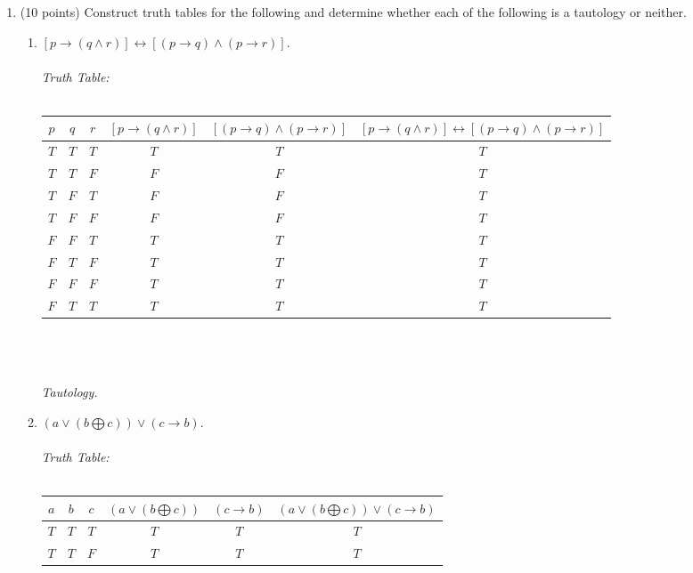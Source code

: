 \documentclass[12pt,fleqn]{article}
\begin{document}
\begin{enumerate}
\begin{enumerate}
\end{enumerate}

\item (10 points) Construct truth tables for the following and determine whether each of the following is a tautology or neither.
\begin{enumerate}
\item \space $[p \rightarrow (q \wedge r)]\leftrightarrow[(p \rightarrow q) \wedge (p \rightarrow r)]$.\\\\


\textit{Truth Table:}\\\\
\begin{tabular}{ c | c | c | c | c | c}
  $p$ & $q$ & $r$ & $[p \rightarrow (q \wedge r)]$ & $[(p \rightarrow q) \wedge (p \rightarrow r)]$ & $[p \rightarrow (q \wedge r)]\leftrightarrow[(p \rightarrow q) \wedge (p \rightarrow r)]$\\ \hline
  $T$ & $T$ & $T$ & $T$ & $T$ &$T$ \\ \hline
  $T$ & $T$ & $F$ & $F$ & $F$ &$T$\\ \hline
  $T$ & $F$ & $T$ & $F$ & $F$ &$T$\\ \hline
  $T$ & $F$ & $F$ & $F$ & $F$ &$T$\\ \hline
  $F$ & $F$ & $T$ & $T$ & $T$ &$T$\\ \hline
  $F$ & $T$ & $F$ & $T$ & $T$ &$T$\\ \hline
  $F$ & $F$ & $F$ & $T$ & $T$ &$T$\\ \hline
  $F$ & $T$ & $T$ & $T$ & $T$ &$T$ \\     
\end{tabular}\\\\\ \\
\textit{Tautology.}\\
\item \space $(a \vee (b \bigoplus c)) \vee (c \rightarrow b)$.\\\\
\textit{Truth Table:}\\\\
\begin{tabular}{ c | c | c | c | c | c}
  $a$ & $b$ & $c$ & $(a \vee (b \bigoplus c))$ & $(c \rightarrow b)$ & $(a \vee (b \bigoplus c)) \vee (c \rightarrow b)$\\ \hline
  $T$ & $T$ & $T$ & $T$ & $T$ &$T$ \\ \hline
  $T$ & $T$ & $F$ & $T$ & $T$ &$T$\\ \hline

\end{tabular}
\end{enumerate}
\end{enumerate}
\end{document}
